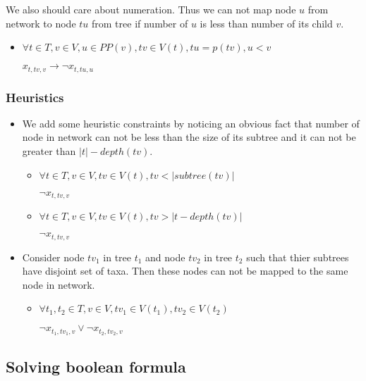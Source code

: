 \documentclass[runningheads, envcountsame, a4paper]{llncs}
\begin{document}
\begin{itemize}
	We also should care about numeration. Thus we can not map node $u$ from network to node $tu$ from tree if number of $u$ is less than number of its child $v$.

	\begin{itemize}
    \item $\forall t \in T, v \in V, u \in PP(v), tv \in V(t), tu = p(tv), u < v$

    $x_{t,tv,v} \rightarrow \neg x_{t,tu,u}$
	\end {itemize}
	
\end {itemize}

\subsubsection{Heuristics}

\begin{itemize}
	\item We add some heuristic constraints by noticing an obvious fact that number of node in network can not be less than the size of its subtree and it can not be greater than $|t| - depth(tv)$.

	\begin{itemize}
    \item $\forall t \in T, v \in V, tv \in V(t), tv < |subtree(tv)|$

    $\neg x_{t,tv,v}$
    
    \item $\forall t \in T, v \in V, tv \in V(t), tv > |t - depth(tv)|$
    
    $\neg x_{t,tv,v}$
	\end {itemize}
	
	\item Consider node $tv_1$ in tree $t_1$ and node $tv_2$ in tree $t_2$ such that thier subtrees have disjoint set of taxa. Then these nodes can not be mapped to the same node in network.
	
	\begin{itemize}
    \item $\forall t_1, t_2 \in T, v \in V, tv_1 \in V(t_1), tv_2 \in V(t_2)$

    $\neg x_{t_1,tv_1,v} \vee \neg x_{t_2,tv_2,v}$

	\end {itemize}

\end {itemize}

\subsection{Solving boolean formula}
\end{document}
